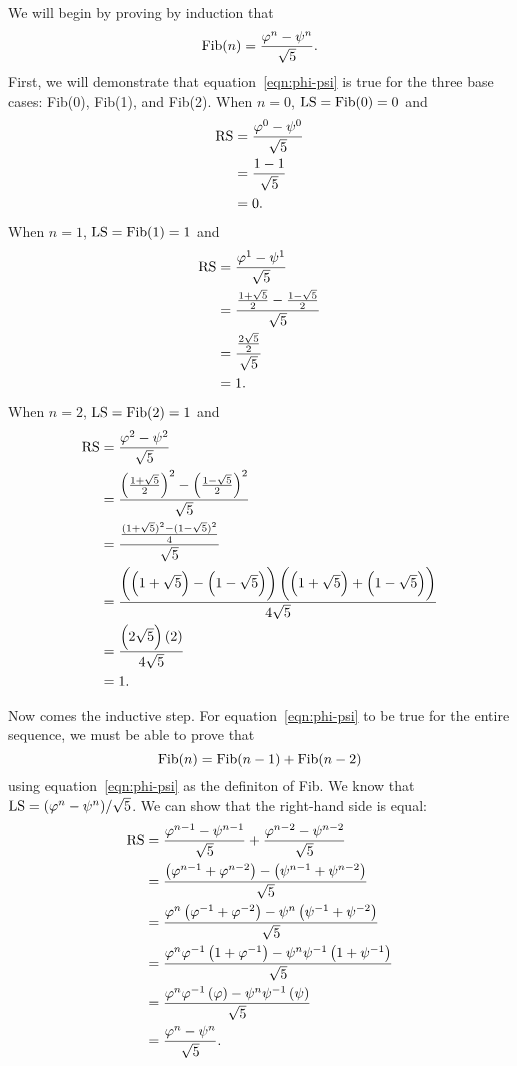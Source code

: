 \documentclass{article}
\begin{document}
We will begin by proving by induction that \begin{equation}\label{eqn:phi-psi}\textup{Fib}(n)=\frac{\varphi^n-\psi^n}{\sqrt{5}}.\end{equation}
First, we will demonstrate that equation~\eqref{eqn:phi-psi} is true for the three base cases: Fib(0), Fib(1), and Fib(2).
When \(n=0\), \(\textup{LS}=\textup{Fib}(0)=0\) and
\begin{align*}
\textup{RS} &= \frac{\varphi^0-\psi^0}{\sqrt{5}}\\
&= \frac{1-1}{\sqrt5}\\
&= 0.
\end{align*}
When \(n=1\), \(\textup{LS}=\textup{Fib}(1)=1\) and
\begin{align*}
\textup{RS} &=  \frac{\varphi^1-\psi^1}{\sqrt{5}}\\
&= \frac{\frac{1+\sqrt5}{2}-\frac{1-\sqrt5}{2}}{\sqrt5}\\
&= \frac{\frac{2\sqrt5}{2}}{\sqrt5}\\
&= 1.
\end{align*}
When \(n=2\), \(\textup{LS}=\textup{Fib}(2)=1\) and
\begin{align*}
\textup{RS} &=  \frac{\varphi^2-\psi^2}{\sqrt{5}}\\
&= \frac{\left(\frac{1+\sqrt5}{2}\right)^2-
\left(\frac{1-\sqrt5}{2}\right)^2}{\sqrt5}\\
&= \frac{\frac{(1+\sqrt5)^2-(1-\sqrt5)^2}{4}}{\sqrt5}\\
&= \frac{\left(\left(1+\sqrt5\right) - \left(1-\sqrt5\right)\right)\left(\left(1+\sqrt5\right)+\left(1-\sqrt5\right)\right)}{4\sqrt5}\\
&= \frac{\left(2\sqrt5\right)\left(2\right)}{4\sqrt5}\\
&= 1.
\end{align*}

Now comes the inductive step. For equation~\eqref{eqn:phi-psi} to be true for the entire sequence, we must be able to prove that \[\textup{Fib}(n) = \textup{Fib}(n-1) + \textup{Fib}(n-2)\] using equation~\eqref{eqn:phi-psi} as the definiton of Fib. We know that \(\textup{LS}=(\varphi^n-\psi^n)/\sqrt{5}\). We can show that the right-hand side is equal:
\begin{align*}
\textup{RS} &= \frac{\varphi^{n-1}-\psi^{n-1}}{\sqrt{5}} + \frac{\varphi^{n-2}-\psi^{n-2}}{\sqrt{5}}\\
&= \frac{\left(\varphi^{n-1}+\varphi^{n-2}\right)-\left(\psi^{n-1}+\psi^{n-2}\right)}{\sqrt5}\\
&= \frac{\varphi^n\left(\varphi^{-1}+\varphi^{-2}\right)-\psi^n\left(\psi^{-1}+\psi^{-2}\right)}{\sqrt5}\\
&= \frac{\varphi^n\varphi^{-1}\left(1+\varphi^{-1}\right)-\psi^n\psi^{-1}\left(1+\psi^{-1}\right)}{\sqrt5}\\
&= \frac{\varphi^n\varphi^{-1}\left(\varphi\right)-\psi^n\psi^{-1}\left(\psi\right)}{\sqrt5}\\
&= \frac{\varphi^n-\psi^n}{\sqrt5}.
\end{align*}
\end{document}

